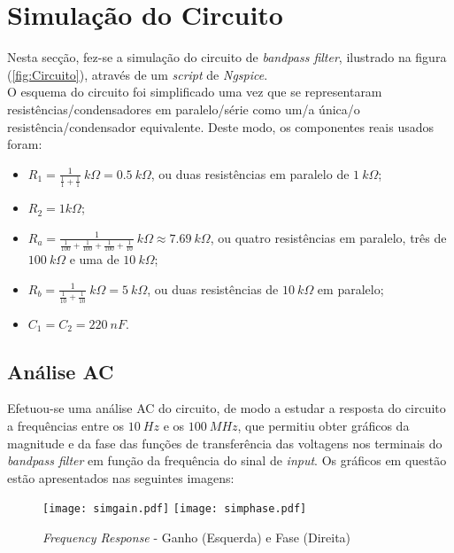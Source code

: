 \section{Simulação do Circuito}
\label{sec:simulation}

Nesta secção, fez-se a simulação do circuito de \emph{bandpass filter}, ilustrado na figura (\ref{fig:Circuito}),
através de um \emph{script} de \emph{Ngspice}.
\\
O esquema do circuito foi simplificado uma vez que se representaram resistências/condensadores em paralelo/série
como um/a única/o resistência/condensador equivalente. Deste modo, os componentes reais usados foram:

\begin{itemize}
    \item $R_1 = \frac{1}{\frac{1}{1} + \frac{1}{1}} \: k\Omega = 0.5 \: k\Omega$, ou duas resistências em paralelo de $1 \: k\Omega$;
    \item $R_2 = 1 k\Omega$;
    \item $R_a = \frac{1}{\frac{1}{100} + \frac{1}{100} + \frac{1}{100} + \frac{1}{10}} \: k\Omega \approx 7.69 \: k\Omega$, ou quatro resistências
    em paralelo, três de $100 \: k\Omega$ e uma de $10 \: k\Omega$;
    \item $R_b = \frac{1}{\frac{1}{10} + \frac{1}{10}} \: k\Omega = 5 \: k\Omega$, ou duas resistências de $10 \: k\Omega$ em paralelo;
    \item $C_1 = C_2 = 220 \: nF$.
\end{itemize}


\subsection{Análise AC}

Efetuou-se uma análise AC do circuito, de modo a estudar a resposta do circuito a frequências entre os $10 \:Hz$ e
os $100 \: MHz$, que permitiu obter gráficos da magnitude e da fase das funções de transferência das voltagens nos
terminais do \emph{bandpass filter} em função da frequência do sinal de \emph{input}. Os gráficos em questão estão
apresentados nas seguintes imagens:

\begin{figure}[H] \centering
    \texttt{[image: simgain.pdf]}
    \texttt{[image: simphase.pdf]}
    \caption{\emph{Frequency Response} - Ganho (Esquerda) e Fase (Direita)}
    \label{fig:SimFR}
\end{figure}

